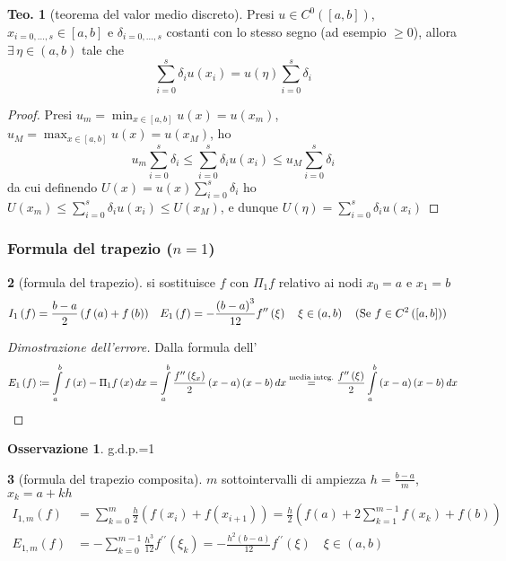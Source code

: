 \documentclass[a4paper,10pt]{article}
\theoremstyle{definition}
\theoremstyle{indentdefinition}
\theoremstyle{indenttheorem}
\newtheorem{thm}{Teo.}
\theoremstyle{myremark}
\newtheorem*{rem*}{Osservazione}
\theoremstyle{indentgeneral}
\newtheorem{lyxalgorithm}[thm]{\protect\algorithmname}
\theoremstyle{plain}
\theoremstyle{plain}
\begin{document}
\begin{thm}[teorema del valor medio discreto]
Presi $u\in C^{0}\left(\left[a,b\right]\right)$, $x_{i=0,\ldots,s}\in\left[a,b\right]$
e $\delta_{i=0,\ldots,s}$ costanti con lo stesso segno (ad esempio
$\geq0$), allora $\exists\,\eta\in\left(a,b\right)$ tale che
\[
\sum_{i=0}^{s}\delta_{i}u\left(x_{i}\right)=u\left(\eta\right)\sum_{i=0}^{s}\delta_{i}
\]
\end{thm}

\begin{proof}
Presi $u_{m}=\min_{x\in\left[a,b\right]}u\left(x\right)=u\left(x_{m}\right)$,
$u_{M}=\max_{x\in\left[a,b\right]}u\left(x\right)=u\left(x_{M}\right)$,
ho 
\[
u_{m}\sum_{i=0}^{s}\delta_{i}\leq\sum_{i=0}^{s}\delta_{i}u\left(x_{i}\right)\leq u_{M}\sum_{i=0}^{s}\delta_{i}
\]
da cui definendo $U\left(x\right)=u\left(x\right)\sum_{i=0}^{s}\delta_{i}$
ho $U\left(x_{m}\right)\leq\sum_{i=0}^{s}\delta_{i}u\left(x_{i}\right)\leq U\left(x_{M}\right)$,
e dunque $U\left(\eta\right)=\sum_{i=0}^{s}\delta_{i}u\left(x_{i}\right)$
\end{proof}

\subsubsection{Formula del trapezio ($n=1$)}
\begin{lyxalgorithm}[formula del trapezio]  si sostituisce $f$ con $\Pi_1f$ relativo ai nodi $x_0=a$ e $x_1=b$
\label{def:formula-trapezio}
\begin{align*}
I_{1}\left(f\right) & =\frac{b-a}{2}\left(f\left(a\right)+f\left(b\right)\right) & E_{1}\left(f\right) & =-\frac{\left(b-a\right)^{3}}{12}f^{\prime\prime}\left(\xi\right)\quad\xi\in\left(a,b\right)\quad\text{(Se \ensuremath{f\in C^{2}\left(\left[a,b\right]\right)})}
\end{align*}
\end{lyxalgorithm}

\begin{proof}[Dimostrazione dell'errore]
Dalla formula dell'
\[
E_{1}\left(f\right)\coloneqq\intop_{a}^{b}f\left(x\right)-\Pi_{1}f\left(x\right)dx=\intop_{a}^{b}\frac{f^{\prime\prime}\left(\xi_{x}\right)}{2}\left(x-a\right)\left(x-b\right)dx\overset{\text{media integ.}}{=}\frac{f^{\prime\prime}\left(\xi\right)}{2}\intop_{a}^{b}\left(x-a\right)\left(x-b\right)dx
\]
\end{proof}
\begin{rem*}
    g.d.p.=1
\end{rem*}
\begin{lyxalgorithm}[formula del trapezio composita] $m$ sottointervalli di ampiezza
$h=\frac{b-a}{m}$, $x_{k}=a+kh$
\begin{align*}
I_{1,m}\left(f\right) &=\sum_{k=0}^{m}\frac{h}{2}\left(f(x_i)+f(x_{i+1})\right)=\frac{h}{2}\left(f\left(a\right)+2\sum_{k=1}^{m-1}f\left(x_{k}\right)+f\left(b\right)\right) \\
E_{1,m}\left(f\right) &=-\sum_{k=0}^{m-1}\frac{h^{3}}{12}f^{\prime\prime}\left(\xi_{k}\right)=-\frac{h^{2}\left(b-a\right)}{12}f^{\prime\prime}\left(\xi\right)\quad\xi\in\left(a,b\right)
\end{align*}
\end{lyxalgorithm}
\end{document}
